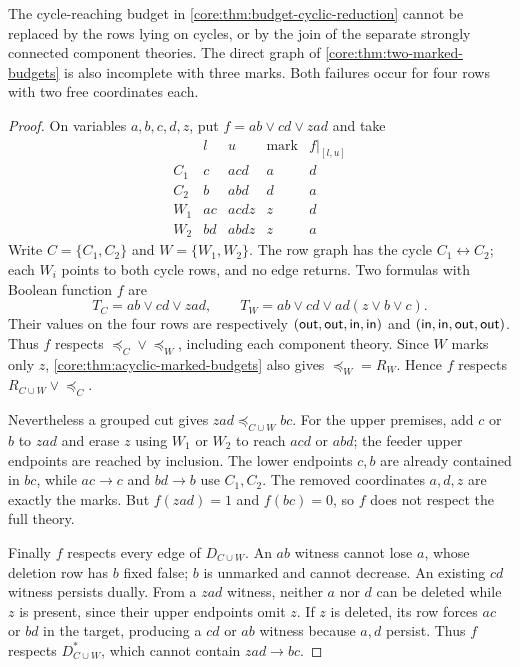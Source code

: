 \begin{proposition}
\label{core:prop:cyclic-component-gluing}
The cycle-reaching budget in \cref{core:thm:budget-cyclic-reduction}
cannot be replaced by the rows lying on cycles, or by the join of the
separate strongly connected component theories. The direct graph of
\cref{core:thm:two-marked-budgets} is also incomplete with three marks.
Both failures occur for four rows with two free coordinates each.
\end{proposition}
\begin{proof}
On variables $a,b,c,d,z$, put $f=ab\vee cd\vee zad$ and take
\[
\begin{array}{c|ccc|c}
 &l&u&\text{mark}&f|_{[l,u]}\\\hline
 C_1&c&acd&a&d\\
 C_2&b&abd&d&a\\
 W_1&ac&acdz&z&d\\
 W_2&bd&abdz&z&a
\end{array}
\]
Write $C=\{C_1,C_2\}$ and $W=\{W_1,W_2\}$. The row graph has the
cycle $C_1\leftrightarrow C_2$; each $W_i$ points to both cycle rows,
and no edge returns. Two formulas with Boolean function $f$ are
\[
 T_C=ab\vee cd\vee zad,\qquad
 T_W=ab\vee cd\vee ad(z\vee b\vee c).
\]
Their values on the four rows are respectively
$(\mathsf{out},\mathsf{out},\mathsf{in},\mathsf{in})$ and $(\mathsf{in},\mathsf{in},\mathsf{out},\mathsf{out})$.
Thus $f$ respects $\preceq_C\vee\preceq_W$, including each component
theory. Since $W$ marks only $z$, \cref{core:thm:acyclic-marked-budgets}
also gives $\preceq_W=R_W$. Hence $f$ respects $R_{C\cup W}\vee\preceq_C$.

Nevertheless a grouped cut gives $zad\preceq_{C\cup W}bc$.
For the upper premises, add $c$ or $b$ to $zad$ and erase $z$ using
$W_1$ or $W_2$ to reach $acd$ or $abd$; the feeder upper endpoints
are reached by inclusion. The lower endpoints $c,b$ are already
contained in $bc$, while $ac\to c$ and $bd\to b$ use $C_1,C_2$.
The removed coordinates $a,d,z$ are exactly the marks. But
$f(zad)=1$ and $f(bc)=0$, so $f$ does not respect the full theory.

Finally $f$ respects every edge of $D_{C\cup W}$. An $ab$ witness
cannot lose $a$, whose deletion row has $b$ fixed false; $b$ is unmarked
and cannot decrease. An existing $cd$ witness persists dually. From a
$zad$ witness, neither $a$ nor $d$ can be deleted while $z$ is present,
since their upper endpoints omit $z$. If $z$ is deleted, its row forces
$ac$ or $bd$ in the target, producing a $cd$ or $ab$ witness because
$a,d$ persist. Thus $f$ respects $D_{C\cup W}^*$, which cannot contain
$zad\to bc$.
\end{proof}

